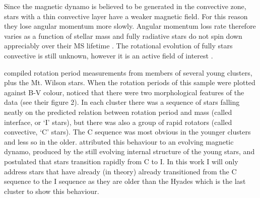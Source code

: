 Since the magnetic dynamo is believed to be generated in the convective zone,
stars with a thin convective layer have a weaker magnetic field.
For this reason they lose angular momentum more slowly.
Angular momentum loss rate therefore varies as a function of stellar mass and
fully radiative stars do not spin down appreciably over their MS lifetime
\citet{Noyes1984_2}.
The rotational evolution of fully stars convective is still unknown, however
it is an active field of interest \citep[\eg][]{Mcquillan2013, Newton2015}.

\citet{Barnes2003} compiled rotation period measurements from members of
several young clusters, plus the Mt. Wilson stars.
When the rotation periods of this sample were plotted against B-V colour,
\citet{Barnes2003} noticed that there were two morphological features of the
data (see their figure 2).
In each cluster there was a sequence of stars falling neatly on the predicted
relation between rotation period and mass (called interface, or `I' stars),
but there was also a group of rapid rotators (called convective, `C' stars).
The C sequence was most obvious in the younger clusters and less so in the
older.
\citet{Barnes2003} attributed this behaviour to an evolving magnetic dynamo,
produced by the still evolving internal structure of the young stars, and
postulated that stars transition rapidly from C to I.
In this work I will only address stars that have already (in theory) already
transitioned from the C sequence to the I sequence as they are older than the
Hyades which is the last cluster to show this behaviour.

